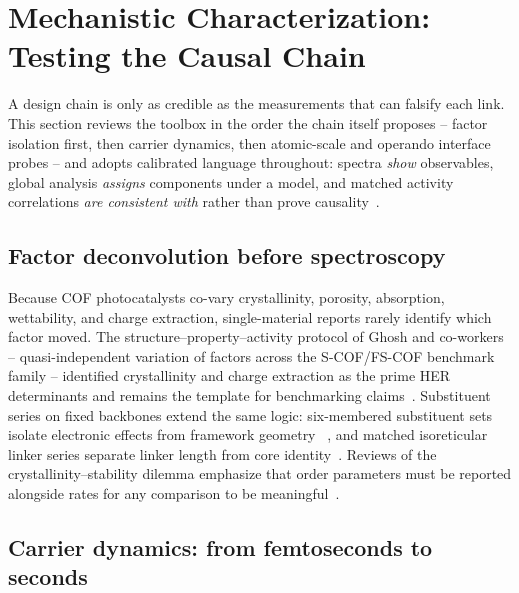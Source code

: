 \section{Mechanistic Characterization: Testing the Causal Chain}
\label{sec:mechanism}

A design chain is only as credible as the measurements that can falsify each
link. This section reviews the toolbox in the order the chain itself
proposes -- factor isolation first, then carrier dynamics, then atomic-scale
and operando interface probes -- and adopts calibrated language throughout:
spectra \emph{show} observables, global analysis \emph{assigns} components
under a model, and matched activity correlations \emph{are consistent with}
rather than prove causality~\cite{choi2024understanding}.

\subsection{Factor deconvolution before spectroscopy}

Because COF photocatalysts co-vary crystallinity, porosity, absorption,
wettability, and charge extraction, single-material reports rarely identify
which factor moved. The structure--property--activity protocol of
Ghosh and co-workers -- quasi-independent variation of factors across the
S-COF/FS-COF benchmark family -- identified crystallinity and charge
extraction as the prime HER determinants and remains the template for
benchmarking claims~\cite{ghosh2020identification,wang2018sulfone}.
Substituent series on fixed backbones extend the same logic: six-membered
substituent sets isolate electronic effects from framework geometry
~\cite{jiang2024significant}, and matched isoreticular linker series
separate linker length from core identity~\cite{dong2025synergistic}.
Reviews of the crystallinity--stability dilemma emphasize that order
parameters must be reported alongside rates for any comparison to be
meaningful~\cite{ran2024progress,xiao2024molecular}.

\subsection{Carrier dynamics: from femtoseconds to seconds}

